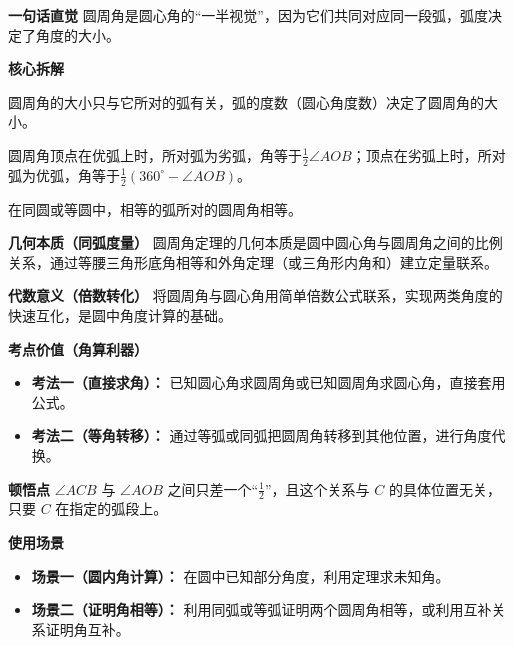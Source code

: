 \begin{explanationbox}
	\textbf{\textcolor{CExplanation}{一句话直觉}}
	圆周角是圆心角的“一半视觉”，因为它们共同对应同一段弧，弧度决定了角度的大小。

	\medskip
	\textbf{\textcolor{CExplanation}{核心拆解}}
	\begin{description}[style=nextline, leftmargin=2.8em, labelsep=0.5em, itemsep=0.45em]
		\item[\textbf{要点一（弧定角大小）：}]
			圆周角的大小只与它所对的弧有关，弧的度数（圆心角度数）决定了圆周角的大小。
		\item[\textbf{要点二（位置分优劣）：}]
			圆周角顶点在优弧上时，所对弧为劣弧，角等于$\frac12\angle AOB$；顶点在劣弧上时，所对弧为优弧，角等于$\frac12(360^\circ - \angle AOB)$。
		\item[\textbf{要点三（等弧得等角）：}]
			在同圆或等圆中，相等的弧所对的圆周角相等。
	\end{description}

	\medskip
	\textbf{\textcolor{CExplanation}{几何本质（同弧度量）}}
	圆周角定理的几何本质是圆中圆心角与圆周角之间的比例关系，通过等腰三角形底角相等和外角定理（或三角形内角和）建立定量联系。

	\medskip
	\textbf{\textcolor{CExplanation}{代数意义（倍数转化）}}
	将圆周角与圆心角用简单倍数公式联系，实现两类角度的快速互化，是圆中角度计算的基础。

	\medskip
	\textbf{\textcolor{CExplanation}{考点价值（角算利器）}}
	\begin{itemize}[leftmargin=*, itemsep=0.5em, topsep=0.4em]
		\item \textbf{考法一（直接求角）：} 已知圆心角求圆周角或已知圆周角求圆心角，直接套用公式。
		\item \textbf{考法二（等角转移）：} 通过等弧或同弧把圆周角转移到其他位置，进行角度代换。
	\end{itemize}

	\medskip
	\textbf{\textcolor{CExplanation}{顿悟点}}
	$\angle ACB$ 与 $\angle AOB$ 之间只差一个“$\frac12$”，且这个关系与 $C$ 的具体位置无关，只要 $C$ 在指定的弧段上。

	\medskip
	\textbf{\textcolor{CExplanation}{使用场景}}
	\begin{itemize}[leftmargin=*, itemsep=0.5em, topsep=0.4em]
		\item \textbf{场景一（圆内角计算）：} 在圆中已知部分角度，利用定理求未知角。
		\item \textbf{场景二（证明角相等）：} 利用同弧或等弧证明两个圆周角相等，或利用互补关系证明角互补。
	\end{itemize}

\end{explanationbox}
